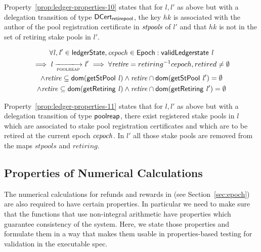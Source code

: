 Property~\ref{prop:ledger-properties-10} states that for $l, l'$ as above but
with a delegation transition of type $\mathsf{DCert_{retirepool}}$, the key $hk$ is
associated with the author of the pool registration certificate in
$\mathit{stpools}$ of $l'$ and that $hk$ is not in the set of retiring stake pools
in $l'$.

\begin{property}
  \begin{multline*}
    \forall \var{l}, \var{l'} \in \ledgerState, \var{cepoch} \in \Epoch:
    \applyFun{validLedgerstate}{l} \\
    \implies \var{l} \trans{poolreap}{} \var{l'} \implies \forall \var{retire} =
    retiring^{-1} cepoch, retired \neq \emptyset \\ \wedge \var{retire}
    \subseteq \fun{dom}(\applyFun{getStPool}{l}) \wedge
    \var{retire} \cap \fun{dom}(\applyFun{getStPool}{l'}) = \emptyset \\
    \wedge \var{retire} \subseteq \fun{dom}(\applyFun{getRetiring}{l}) \wedge
    \var{retire} \cap \fun{dom}(\applyFun{getRetiring}{l'}) = \emptyset
  \end{multline*}
  \label{prop:ledger-properties-11}
\end{property}

Property~\ref{prop:ledger-properties-11} states that for $l, l'$ as above but
with a delegation transition of type $\mathsf{poolreap}$, there exist registered stake
pools in $l$ which are associated to stake pool registration certificates and
which are to be retired at the current epoch $\mathit{cepoch}$. In $l'$ all those
stake pools are removed from the maps $stpools$ and $retiring$.


\subsection{Properties of Numerical Calculations}
\label{sec:prop-numer-calc}

The numerical calculations for refunds and rewards in
(see Section~\ref{sec:epoch}) are also required to have certain properties. In
particular we need to make sure that the functions that use non-integral
arithmetic have properties which guarantee consistency of the system. Here, we
state those properties and formulate them in a way that makes them usable in
properties-based testing for validation in the executable spec.

